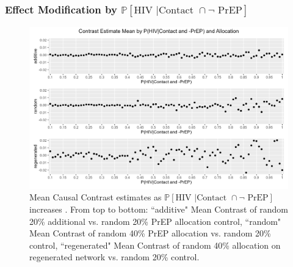 \documentclass{article}
\theoremstyle{definition}
\begin{document}
\subsubsection{Effect Modification by \texorpdfstring{$\mathbb{P}[\text{HIV } | \text {Contact } \cap \neg \text{ PrEP}]$}{ℙ[HIV | ¬PrEP]}}
\begin{figure}[H]
    \centering
    \includegraphics[width=\linewidth]{Figures/p1 Mean plots.png}
    \caption{Mean Causal Contrast estimates as $\mathbb{P}\left[\text{HIV } \vert \text {Contact } \cap \neg \text{ PrEP}\right]$ increases . From top to bottom: ``additive" Mean Contrast of random 20\% additional vs. random 20\% PrEP allocation control, ``random" Mean Contrast of random 40\% PrEP allocation vs. random 20\% control, ``regenerated" Mean Contrast of random 40\% allocation on regenerated network vs. random 20\% control.}
    \label{fig:Figure S4.7}
\end{figure}
\end{document}
